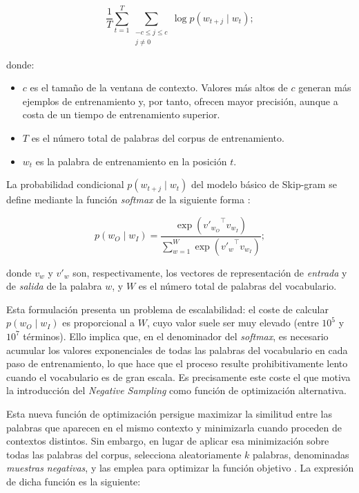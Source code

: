 \[
  \frac{1}{T} \sum_{t=1}^{T} \sum_{\substack{-c \leq j \leq c \\ j \neq 0}} \log p(w_{t+j} \mid w_t);
\]

donde:

\begin{itemize}
  \item $c$ es el tamaño de la ventana de contexto. Valores más altos de $c$ generan más ejemplos de entrenamiento y, por tanto, ofrecen mayor precisión, aunque a costa de un tiempo de entrenamiento superior.
  \item $T$ es el número total de palabras del corpus de entrenamiento.
  \item $w_t$ es la palabra de entrenamiento en la posición $t$.
\end{itemize}

La probabilidad condicional $p(w_{t+j} \mid w_t)$ del modelo básico de Skip-gram se define mediante la función \textit{softmax} de la siguiente forma \cite{tsang_skipgram_review_medium}:

\[
  p(w_O \mid w_I) = \frac{\exp\!\left({v'_{w_O}}^{\top} v_{w_I}\right)}{\displaystyle\sum_{w=1}^{W} \exp\!\left({v'_{w}}^{\top} v_{w_I}\right)};
\]

donde $v_w$ y $v'_w$ son, respectivamente, los vectores de representación de \textit{entrada} y de \textit{salida} de la palabra $w$, y $W$ es el número total de palabras del vocabulario.

Esta formulación presenta un problema de escalabilidad: el coste de calcular $p(w_O \mid w_I)$ es proporcional a $W$, cuyo valor suele ser muy elevado (entre $10^5$ y $10^7$ términos). Ello implica que, en el denominador del \textit{softmax}, es necesario acumular los valores exponenciales de todas las palabras del vocabulario en cada paso de entrenamiento, lo que hace que el proceso resulte prohibitivamente lento cuando el vocabulario es de gran escala. Es precisamente este coste el que motiva la introducción del \textit{Negative Sampling} como función de optimización alternativa.

Esta nueva función de optimización persigue maximizar la similitud entre las palabras que aparecen en el mismo contexto y minimizarla cuando proceden de contextos distintos. Sin embargo, en lugar de aplicar esa minimización sobre todas las palabras del corpus, selecciona aleatoriamente $k$ palabras, denominadas \textit{muestras negativas}, y las emplea para optimizar la función objetivo \cite{karimi_negative_sampling_baeldung_2025}. La expresión de dicha función es la siguiente:


